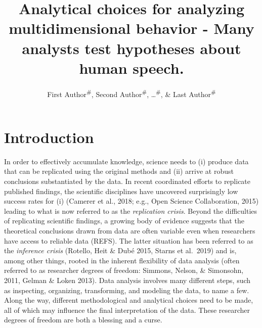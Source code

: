 \documentclass[
  english,
  man,floatsintext]{apa6}
\title{Analytical choices for analyzing multidimensional behavior - Many analysts test hypotheses about human speech.}
\author{First Author\textsuperscript{\#}, Second Author\textsuperscript{\#}, \ldots{}\textsuperscript{\#}, \& Last Author\textsuperscript{\#}}
\date{}
\affiliation{\vspace{0.5cm}\textsuperscript{1} \#\\\textsuperscript{\ldots{}} \ldots{}}
\begin{document}
\maketitle

\hypertarget{introduction}{%
\section{Introduction}\label{introduction}}

In order to effectively accumulate knowledge, science needs to (i) produce data that can be replicated using the original methods and (ii) arrive at robust conclusions substantiated by the data.
In recent coordinated efforts to replicate published findings, the scientific disciplines have uncovered surprisingly low success rates for (i) (Camerer et al., 2018; e.g., Open Science Collaboration, 2015) leading to what is now referred to as the \emph{replication crisis}.
Beyond the difficulties of replicating scientific findings, a growing body of evidence suggests that the theoretical conclusions drawn from data are often variable even when researchers have access to reliable data (REFS).
The latter situation has been referred to as the \emph{inference crisis} (Rotello, Heit \& Dubé 2015, Starns et al.~2019) and is, among other things, rooted in the inherent flexibility of data analysis (often referred to as researcher degrees of freedom: Simmons, Nelson, \& Simonsohn, 2011, Gelman \& Loken 2013).
Data analysis involves many different steps, such as inspecting, organizing, transforming, and modeling the data, to name a few.
Along the way, different methodological and analytical choices need to be made, all of which may influence the final interpretation of the data.
These researcher degrees of freedom are both a blessing and a curse.
\end{document}
